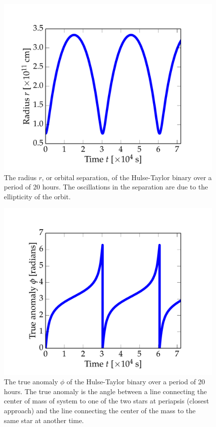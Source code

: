 \documentclass[preprint2]{aastex}
\begin{document}
\begin{figure}[H]
\vspace{-0.24cm}
\centering
\hspace*{-1cm}\includegraphics[width=1.2\textwidth]{orbit_figs/radius.pdf}
\caption{The radius \(r\), or orbital separation, of the Hulse-Taylor binary over a period of 20 hours. The oscillations in the separation are due to the ellipticity of the orbit.}
\label{orbit-radius}
\end{figure}
 
\begin{figure}[H]
\vspace{-0.24cm}
\centering
\hspace*{-1cm}\includegraphics[width=1.2\textwidth]{orbit_figs/true-anomaly.pdf}
\caption{The true anomaly \(\phi\) of the Hulse-Taylor binary over a period of 20 hours. The true anomaly is the angle between a line connecting the center of mass of system to one of the two stars at periapsis (closest approach) and the line connecting the center of the mass to the same star at another time.}
\label{orbit-phi}
\end{figure}
\end{document}

